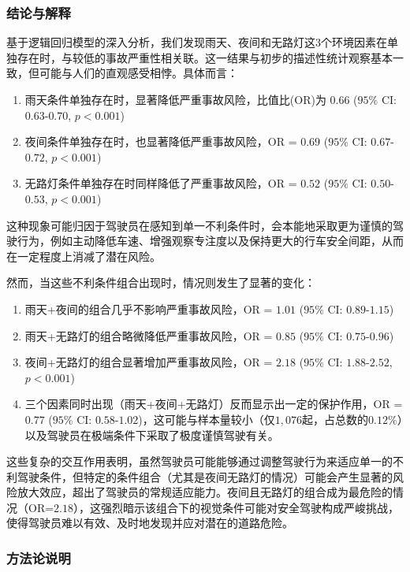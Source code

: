 \documentclass[12pt,a4paper]{article}
\begin{document}
\subsubsection{结论与解释}

基于逻辑回归模型的深入分析，我们发现雨天、夜间和无路灯这$3$个环境因素在单独存在时，与较低的事故严重性相关联。这一结果与初步的描述性统计观察基本一致，但可能与人们的直观感受相悖。具体而言：

\begin{enumerate}
\item 雨天条件单独存在时，显著降低严重事故风险，比值比(OR)为 $0.66$ ($95\%$ CI: $0.63$-$0.70$, $p < 0.001$)
\item 夜间条件单独存在时，也显著降低严重事故风险，OR = $0.69$ ($95\%$ CI: $0.67$-$0.72$, $p < 0.001$)
\item 无路灯条件单独存在时同样降低了严重事故风险，OR = $0.52$ ($95\%$ CI: $0.50$-$0.53$, $p < 0.001$)
\end{enumerate}

这种现象可能归因于驾驶员在感知到单一不利条件时，会本能地采取更为谨慎的驾驶行为，例如主动降低车速、增强观察专注度以及保持更大的行车安全间距，从而在一定程度上消减了潜在风险。

然而，当这些不利条件组合出现时，情况则发生了显著的变化：

\begin{enumerate}
\item 雨天+夜间的组合几乎不影响严重事故风险，OR = $1.01$ ($95\%$ CI: $0.89$-$1.15$)
\item 雨天+无路灯的组合略微降低严重事故风险，OR = $0.85$ ($95\%$ CI: $0.75$-$0.96$)
\item 夜间+无路灯的组合显著增加严重事故风险，OR = $2.18$ ($95\%$ CI: $1.88$-$2.52$, $p < 0.001$)
\item 三个因素同时出现（雨天+夜间+无路灯）反而显示出一定的保护作用，OR = $0.77$ ($95\%$ CI: $0.58$-$1.02$)，这可能与样本量较小（仅$1,076$起，占总数的$0.12\%$）以及驾驶员在极端条件下采取了极度谨慎驾驶有关。
\end{enumerate}

这些复杂的交互作用表明，虽然驾驶员可能能够通过调整驾驶行为来适应单一的不利驾驶条件，但特定的条件组合（尤其是夜间无路灯的情况）可能会产生显著的风险放大效应，超出了驾驶员的常规适应能力。夜间且无路灯的组合成为最危险的情况（OR=$2.18$），这强烈暗示该组合下的视觉条件可能对安全驾驶构成严峻挑战，使得驾驶员难以有效、及时地发现并应对潜在的道路危险。

\subsubsection{方法论说明}
\end{document}
